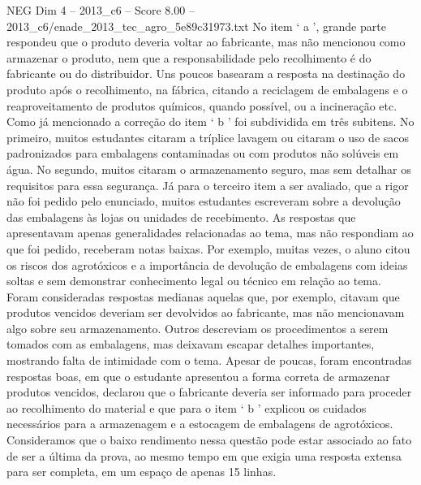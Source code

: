 \begin{textsample}{NEG Dim 4 – 2013\_c6 – Score 8.00 – 2013\_c6/enade\_2013\_tec\_agro\_5e89c31973.txt}
No item ‘ a ’, grande parte respondeu que o produto deveria voltar ao fabricante, mas não mencionou como armazenar o produto, nem que a responsabilidade pelo recolhimento é do fabricante ou do distribuidor.
Uns poucos basearam a resposta na destinação do produto após o recolhimento, na fábrica, citando a reciclagem de embalagens e o reaproveitamento de produtos químicos, quando possível, ou a incineração etc.
Como já mencionado a correção do item ‘ b ’ foi subdividida em três subitens.
No primeiro, muitos estudantes citaram a tríplice lavagem ou citaram o uso de sacos padronizados para embalagens contaminadas ou com produtos não solúveis em água.
No segundo, muitos citaram o armazenamento seguro, mas sem detalhar os requisitos para essa segurança.
Já para o terceiro item a ser avaliado, que a rigor não foi pedido pelo enunciado, muitos estudantes escreveram sobre a devolução das embalagens às lojas ou unidades de recebimento.
As respostas que apresentavam apenas generalidades relacionadas ao tema, mas não respondiam ao que foi pedido, receberam notas baixas.
Por exemplo, muitas vezes, o aluno citou os riscos dos agrotóxicos e a importância de devolução de embalagens com ideias soltas e sem demonstrar conhecimento legal ou técnico em relação ao tema.
Foram consideradas respostas medianas aquelas que, por exemplo, citavam que produtos vencidos deveriam ser devolvidos ao fabricante, mas não mencionavam algo sobre seu armazenamento.
Outros descreviam os procedimentos a serem tomados com as embalagens, mas deixavam escapar detalhes importantes, mostrando falta de intimidade com o tema.
Apesar de poucas, foram encontradas respostas boas, em que o estudante apresentou a forma correta de armazenar produtos vencidos, declarou que o fabricante deveria ser informado para proceder ao recolhimento do material e que para o item ‘ b ’ explicou os cuidados necessários para a armazenagem e a estocagem de embalagens de agrotóxicos.
Consideramos que o baixo rendimento nessa questão pode estar associado ao fato de ser a última da prova, ao mesmo tempo em que exigia uma resposta extensa para ser completa, em um espaço de apenas 15 linhas.

\end{textsample}
